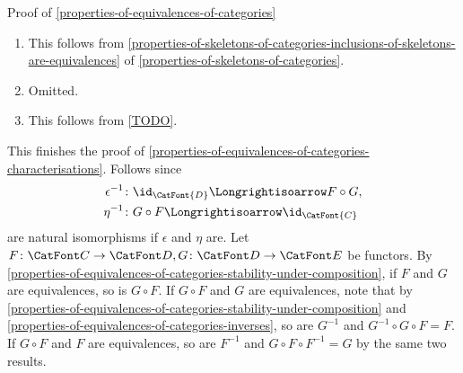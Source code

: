 \begin{Proof}{Proof of \cref{properties-of-equivalences-of-categories}}
\begin{enumerate}
            Since $F$ is fully faithful, we can extend the assignment $B\mapsto j_{B}$ to a \emph{unique} functor $j\colon\CatFont{D}\to\CatFont{C}$ such that the isomorphisms $i_{B}\colon B\to F_{j_{B}}$ assemble into a natural isomorphism $\eta\colon\id_{\CatFont{D}}\Longrightisoarrow F\circ j$, with a similar natural isomorphism $\epsilon\colon\id_{\CatFont{C}}\Longrightisoarrow j\circ F$. Hence $F$ is an equivalence.
        \item{}This follows from \cref{properties-of-skeletons-of-categories-inclusions-of-skeletons-are-equivalences} of \cref{properties-of-skeletons-of-categories}.
        \item{}Omitted.
        \item{}This follows from \cref{TODO}.%
    \end{enumerate}
    This finishes the proof of \cref{properties-of-equivalences-of-categories-characterisations}.
    Follows since
    \begin{align*}
                \epsilon^{-1}     &\colon \id_{\CatFont{D}} \Longrightisoarrow F \circ G,\\%
                \eta^{-1} &\colon G\circ F \Longrightisoarrow \id_{\CatFont{C}}
    \end{align*}
    are natural isomorphisms if $\epsilon$ and $\eta$ are.
    Let $F \colon \CatFont C \to \CatFont D, G \colon \CatFont D \to \CatFont E$ be functors.
    By \cref{properties-of-equivalences-of-categories-stability-under-composition}, if $F$ and $G$ are equivalences, so is $G \circ F$. If $G \circ F$ and $G$ are equivalences, note that by \cref{properties-of-equivalences-of-categories-stability-under-composition} and \cref{properties-of-equivalences-of-categories-inverses}, so are $G^{-1}$ and $G^{-1} \circ G \circ F = F$. If $G \circ F$ and $F$ are equivalences, so are $F^{-1}$ and $G \circ F \circ F^{-1} = G$ by the same two results.


\end{Proof}
